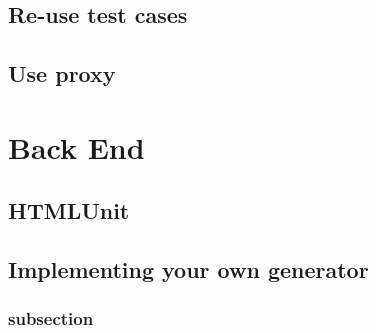 \documentclass[a4paper,11pt]{kth-mag}
\begin{document}
\section{Re-use test cases}

\section{Use proxy}

\chapter{Back End}

\section{HTMLUnit}


\section{Implementing your own generator}
\label{backendimpl}

\subsection{subsection}
\end{document}
